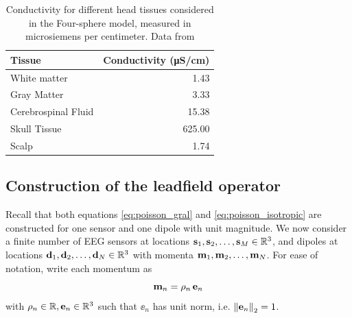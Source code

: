\begin{table}[]
\centering
\begin{tabular}{lr}
\toprule
Tissue              & Conductivity (\unit{\micro \siemens/\cm}) \\ 
\midrule
White matter        & 1.43         \\
Gray Matter         & 3.33         \\
Cerebrospinal Fluid & 15.38        \\
Skull Tissue        & 625.00       \\
Scalp               & 1.74        \\
\bottomrule
\end{tabular}
\caption{Conductivity for different head tissues considered in the Four-sphere model, measured in microsiemens per centimeter. Data from \cite{ramon2006influence}}
\label{tab:conductivity}
\end{table}

\subsection{Construction of the leadfield operator}

Recall that both equations \eqref{eq:poisson_gral} and \eqref{eq:poisson_isotropic} are constructed for one sensor and one dipole with unit magnitude.
%
We now consider a finite number of EEG sensors at locations $\mathbf{s}_1, \mathbf{s}_2, \dots, \mathbf{s}_M \in \mathbb{R}^3$, and dipoles at locations $\mathbf{d}_1, \mathbf{d}_2, \dots, \mathbf{d}_N \in \mathbb{R}^3$
with momenta $\mathbf{m}_1, \mathbf{m}_2, \dots, \mathbf{m}_N$.
%
For ease of notation, write each momentum as
\begin{equation}
    \mathbf{m}_n = \rho_n\, \mathbf{e}_n
\end{equation}
with $\rho_n\in \mathbb{R}, \mathbf{e}_n\in \mathbb{R}^3$ such that $\ee_n$ has unit norm, i.e. $\left\lVert \mathbf{e}_n \right\rVert_2 = 1$.

